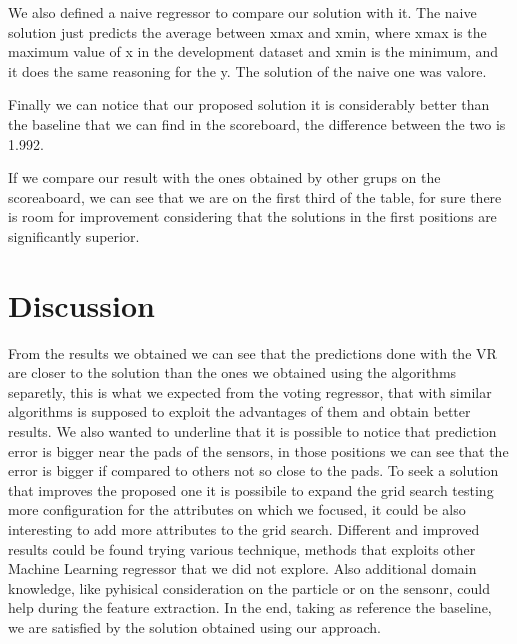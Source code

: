 \documentclass[conference]{IEEEtran}
\begin{document}
We also defined a naive regressor to compare our solution with it. The naive solution just predicts the average between xmax and xmin, where xmax is the maximum value of x in the development dataset and xmin is the minimum, and it does the same reasoning for the y.
The solution of the naive one was valore.

Finally we can notice that our proposed solution it is considerably better than the baseline that we can find in the scoreboard, the difference between the two is 1.992.

If we compare our result with the ones obtained by other grups on the scoreaboard, we can see that we are on the first third of the table, for sure there is room for improvement considering that the solutions in the first positions are significantly superior.

\section{Discussion}
From the results we obtained we can see that the predictions done with the VR are closer to the solution than the ones we obtained using the algorithms separetly, this is what we expected from the voting regressor, that with similar algorithms is supposed to exploit the advantages of them and obtain better results.
We also wanted to underline that it is possible to notice that prediction error is bigger near the pads of the sensors, in those positions we can see that the error is bigger if compared to others not so close to the pads.
To seek a solution that improves the proposed one it is possibile to expand the grid search testing more configuration for the attributes on which we focused, it could be also interesting to add more attributes to the grid search. 
Different and improved results could be found trying various technique, methods that exploits other Machine Learning regressor that we did not explore.
Also additional domain knowledge, like pyhisical consideration on the particle or on the sensonr, could help during the feature extraction.
In the end, taking as reference the baseline, we are satisfied by the solution obtained using our approach.




\end{document}
